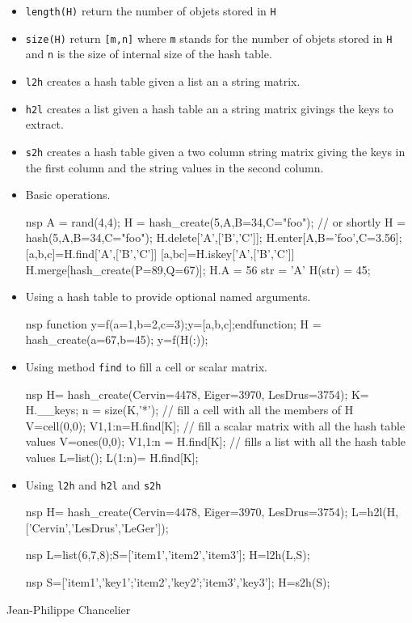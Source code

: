 \begin{itemize}
   \item \verb+length(H)+ return the number of objets stored in \verb+H+
   \item \verb+size(H)+ return \verb+[m,n]+ where \verb+m+ stands for the number 
     of objets stored in \verb+H+ and \verb+n+ is the size of internal size of 
     the hash table.
   \item \verb+l2h+ creates a hash table given a list an a string matrix.
   \item \verb+h2l+ creates a list given a hash table an a string matrix givings the keys to extract.
   \item \verb+s2h+ creates a hash table given a two column string matrix giving the keys in the first column and the string values in the second column.
\end{itemize}

\begin{examples}
\begin{itemize}
\item Basic operations.
\begin{mintednsp}{nsp}
 A = rand(4,4);
 H = hash_create(5,A,B=34,C="foo"); 
 // or shortly H = hash(5,A,B=34,C="foo");
 H.delete['A',['B','C']];
 H.enter[A,B='foo',C=3.56];
 [a,b,c]=H.find['A',['B','C']]
 [a,bc]=H.iskey['A',['B','C']]
 H.merge[hash_create(P=89,Q=67)];
 H.A = 56 
 str = 'A'
 H(str) = 45;
\end{mintednsp}
\item Using a hash table to provide optional named arguments.
\begin{mintednsp}{nsp}
 function y=f(a=1,b=2,c=3);y=[a,b,c];endfunction;
 H = hash_create(a=67,b=45);
 y=f(H(:));
\end{mintednsp}
\item Using method \verb+find+ to fill a cell or scalar matrix.
\begin{mintednsp}{nsp}
  H= hash_create(Cervin=4478, Eiger=3970, LesDrus=3754);
  K= H.__keys;
  n = size(K,'*');
  // fill a cell with all the members of H
  V=cell(0,0);
  V{1,1:n}=H.find[K];
  // fill a scalar matrix with all the hash table values 
  V=ones(0,0);
  V{1,1:n} = H.find[K];
  // fills a list with all the hash table values 
  L=list();
  L(1:n)= H.find[K];
\end{mintednsp}
\item Using \verb+l2h+ and \verb+h2l+ and \verb+s2h+
\begin{mintednsp}{nsp}
  H= hash_create(Cervin=4478, Eiger=3970, LesDrus=3754);
  L=h2l(H,['Cervin','LesDrus','LeGer']);
\end{mintednsp}
\begin{mintednsp}{nsp}
  L=list(6,7,8);S=['item1','item2','item3'];
  H=l2h(L,S);
\end{mintednsp}
\begin{mintednsp}{nsp}
  S=['item1','key1';'item2','key2';'item3','key3'];
  H=s2h(S);
\end{mintednsp}
\end{itemize}
\end{examples}

\begin{authors}
  Jean-Philippe Chancelier
\end{authors}
